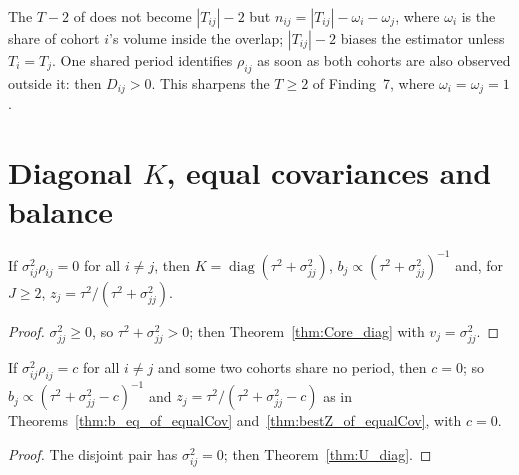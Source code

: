 \begin{remark}\label{rem:unequal_count}
  The $T - 2$ of  does not become $|T_{ij}| - 2$ but
  $n_{ij} = |T_{ij}| - \omega_i - \omega_j$, where $\omega_i$ is the share of
  cohort $i$'s volume inside the overlap; $|T_{ij}| - 2$ biases the estimator
  unless $T_i = T_j$. One shared period identifies $\rho_{ij}$ as soon as both
  cohorts are also observed outside it: then $D_{ij} > 0$. This sharpens the
  $T \ge 2$ of Finding~7, where $\omega_i = \omega_j = 1$.
\end{remark}

\section{Diagonal $K$, equal covariances and balance}

\begin{theorem}[Diagonal $K$]\label{thm:U_diag}
  \leanok
  If $\sigma^2_{ij}\rho_{ij} = 0$ for all $i \ne j$, then
  $K = \operatorname{diag}(\tau^2 + \sigma^2_{jj})$,
  $b_j \propto (\tau^2 + \sigma^2_{jj})^{-1}$ and, for $J \ge 2$,
  $z_j = \tau^2/(\tau^2 + \sigma^2_{jj})$.
\end{theorem}
\begin{proof}
  \leanok
  $\sigma^2_{jj} \ge 0$, so $\tau^2 + \sigma^2_{jj} > 0$; then
  Theorem~\ref{thm:Core_diag} with $v_j = \sigma^2_{jj}$.
\end{proof}

\begin{theorem}\label{thm:U_equalCov}
  \leanok
  If $\sigma^2_{ij}\rho_{ij} = c$ for all $i \ne j$ and some two cohorts share
  no period, then $c = 0$; so $b_j \propto (\tau^2 + \sigma^2_{jj} - c)^{-1}$
  and $z_j = \tau^2/(\tau^2+\sigma^2_{jj}-c)$ as in
  Theorems~\ref{thm:b_eq_of_equalCov} and~\ref{thm:bestZ_of_equalCov}, with
  $c = 0$.
\end{theorem}
\begin{proof}
  \leanok
  The disjoint pair has $\sigma^2_{ij} = 0$; then Theorem~\ref{thm:U_diag}.
\end{proof}

